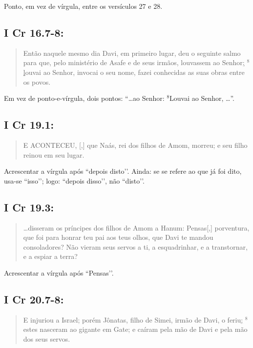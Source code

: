 Ponto, em vez de vírgula, entre os versículos 27 e 28.

\subsection{I Cr 16.7-8:}
\begin{quote}
    \small
Então naquele mesmo dia Davi, em primeiro lugar, deu o seguinte salmo para que, pelo ministério de Asafe e de seus irmãos, louvassem ao Senhor\uline{;} $^{\mathrm{8}}$\uline{l}ouvai ao Senhor, invocai o seu nome, fazei conhecidas as suas obras entre os povos.
\end{quote}

Em vez de ponto-e-vírgula, dois pontos: ``\ldots ao Senhor: $^{\mathrm{8}}$Louvai ao Senhor, \ldots''.


\subsection{I Cr 19.1:}
\begin{quote}
    \small
 E ACONTECEU, [,] que Naás, rei dos filhos de Amom, morreu; e seu filho reinou em seu lugar.
 \end{quote}

Acrescentar a vírgula após ``depois disto’’. Ainda: se se refere ao que já foi dito, usa-se ``isso’’; logo: ``depois disso’’, não ``disto’’.

\subsection{I Cr 19.3:}
\begin{quote}
    \small
\ldots disseram os príncipes dos filhos de Amom a Hanum: Pensas[,] porventura, que foi para honrar teu pai aos teus olhos, que Davi te mandou consoladores? Não vieram seus servos a ti, a esquadrinhar, e a transtornar, e a espiar a terra?
\end{quote}

Acrescentar a vírgula após ``Pensas’’.

\subsection{I Cr 20.7-8:}
\begin{quote}
    \small
E injuriou a Israel; porém Jônatas, filho de Simei, irmão de Davi, o feriu\uline{;} $^{\mathrm{8}}$estes nasceram ao gigante em Gate; e caíram pela mão de Davi e pela mão dos seus servos.
\end{quote}
 
